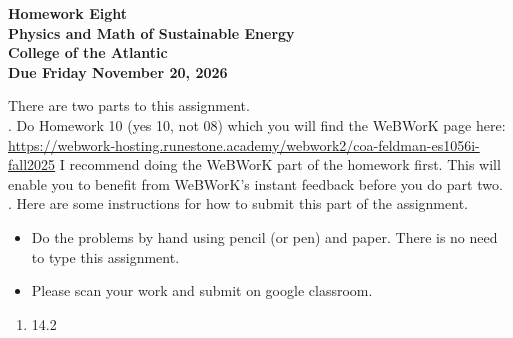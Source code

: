 \documentclass[12pt]{article}
\begin{document}
\pagestyle{empty}
 
\begin{center}
{\LARGE {\bf Homework Eight}}\\
\bigskip
{\Large {\bf Physics and Math of Sustainable Energy}}\\
\bigskip
{\Large {\bf College of the Atlantic}}\\
\bigskip
{ {\bf Due Friday November 20, 2026}}\\ 
\end{center}
\medskip


\noindent There are two parts to this assignment.\\

.  Do Homework 10 (yes 10, not 08) which you
will find the WeBWorK page here:
\url{https://webwork-hosting.runestone.academy/webwork2/coa-feldman-es1056i-fall2025}
I recommend doing the WeBWorK part of the homework first.  This will
enable you to benefit from WeBWorK's instant feedback before you do part
two.\\ 


.  Here are some
instructions for how to submit this part of the assignment.
\begin{itemize}
\item Do the problems by hand using pencil (or pen) and paper.
  There is no need to type this assignment.

\item Please scan your work and submit on google classroom.\\
  
\end{itemize}




\begin{enumerate}
\setlength{\itemsep}{-1mm}
\item 14.2
\end{enumerate}
\end{document}
